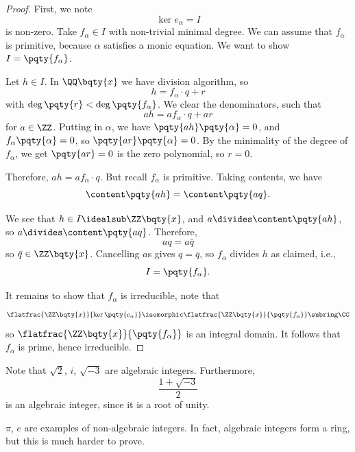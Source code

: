 \begin{proof}
    First, we note
    \[
        \ker e_\alpha = I
    \]
    is non-zero. Take \(f_\alpha \in I\) with non-trivial minimal degree. We can assume that \(f_\alpha\) is primitive, because \(\alpha\) satisfies a monic equation. We want to show \(I = \pqty{f_{\alpha}}\).

    Let \(h \in I\). In \(\QQ\bqty{x}\) we have division algorithm, so
    \[
        h = f_{\alpha} \cdot q + r
    \]
    with \(\deg\pqty{r} < \deg\pqty{f_{\alpha}}\). We clear the denominators, such that
    \[
        ah = af_{\alpha} \cdot q + ar
    \]
    for \(a \in \ZZ\). Putting in \(\alpha\), we have \(\pqty{ah} \pqty{\alpha} = 0\), and \(f_{\alpha} \pqty{\alpha} = 0\), so \(\pqty{ar} \pqty{\alpha} = 0\). By the minimality of the degree of \(f_\alpha\), we get \(\pqty{ar} = 0\) is the zero polynomial, so \(r = 0\).

    Therefore, \(ah = af_{\alpha} \cdot q\). But recall \(f_{\alpha}\) is primitive. Taking contents, we have
    \[
        \content\pqty{ah} = \content\pqty{aq}.
    \]
    
    We see that \(h \in I \idealsub \ZZ\bqty{x}\), and \(a \divides \content\pqty{ah}\), so \(a \divides \content\pqty{aq}\). Therefore,
    \[
        aq = a \bar{q}
    \]
    so \(\bar{q} \in \ZZ\bqty{x}\). Cancelling \(a\)s gives \(q = \bar{q}\), so \(f_\alpha\) divides \(h\) as claimed, i.e.,
    \[
        I = \pqty{f_{\alpha}}.
    \]

    It remains to show that \(f_{\alpha}\) is irreducible, note that
    \[
        \flatfrac{\ZZ\bqty{x}}{\ker\pqty{e_\alpha}} \isomorphic \flatfrac{\ZZ\bqty{x}}{\pqty{f_{\alpha}}} \subring \CC
    \]
    so \(\flatfrac{\ZZ\bqty{x}}{\pqty{f_{\alpha}}}\) is an integral domain. It follows that \(f_\alpha\) is prime, hence irreducible.
\end{proof}

\begin{example}
    \label{ex:algebraic-int}%
    Note that \(\sqrt{2}\), \(i\), \(\sqrt{-3}\) are algebraic integers. Furthermore, 
    \[
        \frac{1 + \sqrt{-3}}{2}
    \]
    is an algebraic integer, since it is a root of unity.
\end{example}

\begin{example}
    \label{ex:non-algebraic-int}%
    \(\pi\), \(e\) are examples of non-algebraic integers. In fact, algebraic integers form a ring, but this is much harder to prove.
\end{example}

